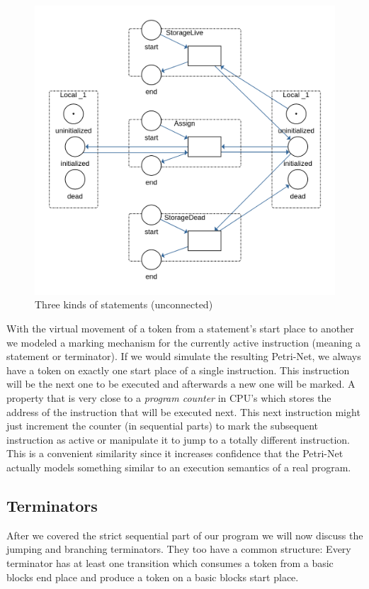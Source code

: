 \begin{figure}
    \centering
    \includegraphics[width=.6\textwidth]{../diagrams/StatementsNet.png}
    \caption{Three kinds of statements (unconnected)}
    \label{statements_net}
\end{figure}

With the virtual movement of a token from a statement's start place to another we modeled a marking mechanism for the currently active instruction (meaning a statement or terminator).
If we would simulate the resulting Petri-Net, we always have a token on exactly one start place of a single instruction.
This instruction will be the next one to be executed and afterwards a new one will be marked.
A property that is very close to a \textit{program counter} in CPU's which stores the address of the instruction that will be executed next.
This next instruction might just increment the counter (in sequential parts) to mark the subsequent instruction as active or manipulate it to jump to a totally different instruction.
This is a convenient similarity since it increases confidence that the Petri-Net actually models something similar to an execution semantics of a real program.

\subsection{Terminators}
\label{terminators}
After we covered the strict sequential part of our program we will now discuss the jumping and branching terminators.
They too have a common structure:
Every terminator has at least one transition which consumes a token from a basic blocks end place and produce a token on a basic blocks start place.

